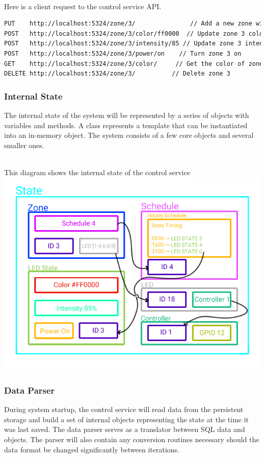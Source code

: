 \documentclass[onecolumn, draftclsnofoot,10pt, compsoc]{IEEEtran}
\begin{document}
			\noindent \\Here is a client request to the control service API.
			\begin{lstlisting}[language=XML]
PUT    http://localhost:5324/zone/3/               // Add a new zone with ID 3
POST   http://localhost:5324/zone/3/color/ff0000  // Update zone 3 color to red
POST   http://localhost:5324/zone/3/intensity/85 // Update zone 3 intensity to 85%
POST   http://localhost:5324/zone/3/power/on    // Turn zone 3 on
GET    http://localhost:5324/zone/3/color/     // Get the color of zone 3, returns ff0000 (red)
DELETE http://localhost:5324/zone/3/          // Delete zone 3
\end{lstlisting}

			\subsubsection{Internal State}
			The internal state of the system will be represented by a series of objects with variables and methods.
			A class represents a template that can be instantiated into an in-memory object.
			The system consists of a few core objects and several smaller ones.

			\noindent \\This diagram shows the internal state of the control service
			\includegraphics[width=\linewidth]{systemDiagrams/state.png}

			\subsubsection{Data Parser}
			During system startup, the control service will read data from the persistent storage and build a set of internal objects representing the state at the time it was last saved.
			The data parser serves as a translator between SQL data and objects.
			The parser will also contain any conversion routines necessary should the data format be changed significantly between iterations.
\end{document}
